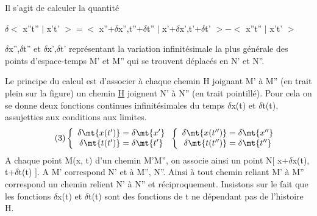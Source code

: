 \begin{center}  \end{center}
Il s'agit de calculer la quantité
\begin{center}
$\delta<$ x''t'' $|$ x't' $>=<$ x''+$\delta$x'',t''+$\delta$t'' $|$ x'+$\delta$x',t'+$\delta$t' $>-<$ x''t'' $|$ x't' $>$
\end{center}
$\delta$x'',$\delta$t'' et $\delta$x',$\delta$t' représentant la variation infinitésimale la plus
générale des points d'espace-temps M' et M'' qui se trouvent déplacés
en N' et N''.

Le principe du calcul est d'associer à chaque chemin H joignant
M' à M'' (en trait plein sur la figure) un chemin \ul{H} joignent N' à N'' (en
trait pointillé). Pour cela on se donne deux fonctions continues infinitésimales du temps $\delta$x(t) et $\delta$t(t), assujetties aux conditions aux limites.
\[
\tag{3}\left\{ \begin{array}{c}
 \delta\mt{x(t')}=\delta\mt{x'} \\
 \delta\mt{t(t')}=\delta\mt{t'} \\ \end{array} \right.
\left\{ \begin{array}{c}
 \delta\mt{x(t'')}=\delta\mt{x''} \\
 \delta\mt{t(t'')}=\delta\mt{t''} \\ \end{array} \right.
\]
A chaque point M(x, t) d'un chemin M'M'', on associe ainsi un point
N$[$ x+$\delta$x(t), t+$\delta$t(t) $]$. A M' correspond N' et à M'', N''. Ainsi à
tout chemin reliant M' à M'' correspond un chemin relient N' à N'' et réciproquement. Insistons sur le fait que les fonctions $\delta$x(t) et $\delta$t(t) sont
des fonctions de t ne dépendant pas de l'histoire H.

